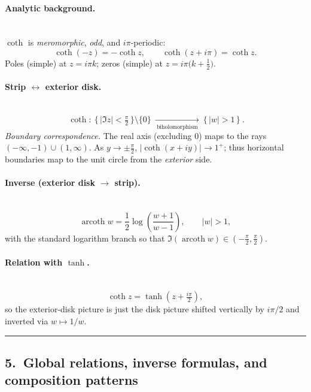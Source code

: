 \documentclass[11pt]{article}
\begin{document}
\paragraph{Analytic background.}\mbox{}\\[2pt]
$\coth$ is \emph{meromorphic}, \emph{odd}, and $i\pi$-periodic:
\[
\coth(-z)=-\coth z,\qquad \coth(z+i\pi)=\coth z.
\]
Poles (simple) at $z=i\pi k$; zeros (simple) at $z=i\pi\big(k+\tfrac12\big)$.

\medskip

\paragraph{Strip $\leftrightarrow$ exterior disk.}\mbox{}\\[2pt]
\[
\boxed{\
	\coth:\ \{\,|\Im z|<\tfrac{\pi}{2}\,\}\setminus\{0\}\ \xrightarrow[\ \text{biholomorphism}\ ]{}\ \{\,|w|>1\,\}\ .
}
\]
\emph{Boundary correspondence.} The real axis (excluding $0$) maps to the rays $(-\infty,-1)\cup(1,\infty)$.
As $y\to\pm\frac{\pi}{2}$, $|\coth(x+iy)|\to1^{+}$; thus horizontal boundaries map to the unit circle from the \emph{exterior} side.

\medskip

\paragraph{Inverse (exterior disk $\to$ strip).}\mbox{}\\[2pt]
\[
\operatorname{arcoth} w=\frac{1}{2}\log\!\left(\frac{w+1}{w-1}\right),\qquad |w|>1,
\]
with the standard logarithm branch so that $\Im(\operatorname{arcoth} w)\in(-\tfrac{\pi}{2},\tfrac{\pi}{2})$.

\medskip

\paragraph{Relation with $\tanh$.}\mbox{}\\[2pt]
\[
\coth z=\tanh\!\left(z+\tfrac{i\pi}{2}\right),
\]
so the exterior-disk picture is just the disk picture shifted vertically by $i\pi/2$ and inverted via $w\mapsto 1/w$.

\bigskip\hrule\bigskip

\subsection*{5.\ Global relations, inverse formulas, and composition patterns}
\end{document}
